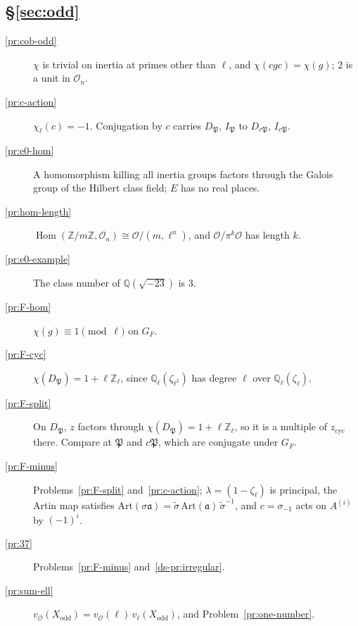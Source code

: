 \documentclass[reqno]{amsart}
\theoremstyle{definition}
\theoremstyle{plain}
\theoremstyle{remark}
\newcommand{\Z}{\mathbb{Z}}
\newcommand{\Q}{\mathbb{Q}}
\newcommand{\Zl}{\Z_\ell}
\newcommand{\Oc}{\mathcal{O}}
\newcommand{\Hom}{\operatorname{Hom}}
\begin{document}
\subsection*{\S\ref{sec:odd}}
\begin{description}
\item[\ref{pr:cob-odd}] \(\chi\) is trivial on inertia at primes other than \(\ell\), and \(\chi(cgc) = \chi(g)\); \(2\) is a unit in \(\Oc_n\).
\item[\ref{pr:c-action}] \(\chi_\ell(c) = -1\).  Conjugation by \(c\) carries \(D_{\mathfrak{P}}\), \(I_{\mathfrak{P}}\) to \(D_{c\mathfrak{P}}\), \(I_{c\mathfrak{P}}\).
\item[\ref{pr:e0-hom}] A homomorphism killing all inertia groups factors through the Galois group of the Hilbert class field; \(E\) has no real places.
\item[\ref{pr:hom-length}] \(\Hom(\Z/m\Z, \Oc_n) \cong \Oc/(m, \ell^n)\), and \(\Oc/\pi^k\Oc\) has length \(k\).
\item[\ref{pr:e0-example}] The class number of \(\Q(\sqrt{-23})\) is \(3\).
\item[\ref{pr:F-hom}] \(\chi(g) \equiv 1 \pmod \ell\) on \(G_F\).
\item[\ref{pr:F-cyc}] \(\chi(D_{\mathfrak{P}}) = 1 + \ell\Zl\), since \(\Q_\ell(\zeta_{\ell^2})\) has degree \(\ell\) over \(\Q_\ell(\zeta_\ell)\).
\item[\ref{pr:F-split}] On \(D_{\mathfrak{P}}\), \(z\) factors through \(\chi(D_{\mathfrak{P}}) = 1 + \ell\Zl\), so it is a multiple of \(z_{\mathrm{cyc}}\) there.  Compare at \(\mathfrak{P}\) and \(c\mathfrak{P}\), which are conjugate under \(G_F\).
\item[\ref{pr:F-minus}] Problems~\ref{pr:F-split} and~\ref{pr:c-action}; \(\lambda = (1 - \zeta_\ell)\) is principal, the Artin map satisfies \(\mathrm{Art}(\sigma \mathfrak{a}) = \tilde\sigma\, \mathrm{Art}(\mathfrak{a})\, \tilde\sigma^{-1}\), and \(c = \sigma_{-1}\) acts on \(A^{(i)}\) by \((-1)^i\).
\item[\ref{pr:37}] Problems~\ref{pr:F-minus} and~\ref{ds-pr:irregular}.
\item[\ref{pr:sum-ell}] \(v_\Oc(X_{\mathrm{odd}}) = v_\Oc(\ell)\, v_\ell(X_{\mathrm{odd}})\), and Problem~\ref{pr:one-number}.
\end{description}
\end{document}
